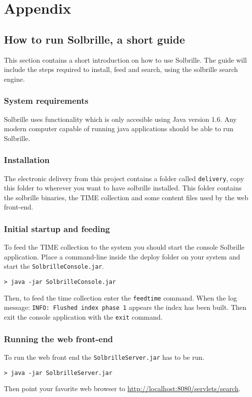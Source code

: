 \chapter{Appendix}
\thispagestyle{fancy}
\section{How to run Solbrille, a short guide}\label{sec:how_to_run}
This section contains a short introduction on how to use Solbrille. The guide will include the steps required to install, feed and search, using the solbrille search engine. 

\subsection{System requirements}\label{sub:system_requirements}
Solbrille uses functionality which is only accesible using Java version 1.6. Any modern computer capable of running java applications should be able to run Solbrille.  

\subsection{Installation}\label{sub:installation}
The electronic delivery from this project contains a folder called \texttt{delivery}, copy this folder to wherever you want to have solbrille installed. This folder contains the solbrille binaries, the TIME collection and some content files used by the web front-end.

\subsection{Initial startup and feeding}\label{sub:initial_startup_and_feeding}
To feed the TIME collection to the system you should start the console Solbrille application. Place a command-line inside the deploy folder on your system and start the \texttt{SolbrilleConsole.jar}.

\begin{verbatim} 
> java -jar SolbrilleConsole.jar
\end{verbatim} 

Then, to feed the time collection enter the \texttt{feedtime} command. When the log message: \texttt{INFO: Flushed index phase 1} appears the index has been built. Then exit the console application with the \texttt{exit} command. 

\subsection{Running the web front-end}\label{sub:running_the_web_front_end}
To run the web front end the \texttt{SolbrilleServer.jar} has to be run. 

\begin{verbatim} 
> java -jar SolbrilleServer.jar
\end{verbatim}

Then point your favorite web browser to \url{http://localhost:8080/servlets/search}. 